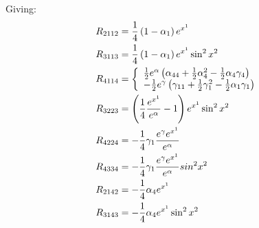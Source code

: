 Giving:
\begin{align}
R_{2112}&= \frac{1}{4} \left(1-\alpha _1 \right) e^{x^1} \\
R_{3113}&=  \frac{1}{4}\left(1-\alpha _1 \right) e^{x^1}\sin^2 x^2 \\
R_{4114}&= \left\{ \begin{array}{l}
\frac{1}{2} e^{\alpha} \left(\alpha_{44}  + \frac{1}{2}\alpha_{4}^2 
- \frac{1}{2} \alpha _4\gamma _4  \right) \\ -\frac{1}{2} e^{\gamma} \left(\gamma_{11} +\frac{1}{2}\gamma_{1}^2 
-  \frac{1}{2} \alpha _1\gamma _1  
\right)
\end{array}\right.
\\
R_{3223}&=
 \left(\frac{1}{4}\frac{e^{x^1}}{e^{\alpha}}-1 \right)e^{x^1}\sin^2 x^2\\
R_{4224}&=
-\frac{1}{4} \gamma _1  \frac{e^{\gamma}e^{x^1}}{e^{\alpha}}\\
R_{4334}&=
-\frac{1}{4} \gamma _1  \frac{e^{\gamma}e^{x^1}}{e^{\alpha}}sin^2 x^2 \\
R_{2142}&= -\frac{1}{4}\alpha_4 e^{x^1}\\
R_{3143}&= -\frac{1}{4}\alpha_4 e^{x^1}\sin^2 x^2
\end{align}


